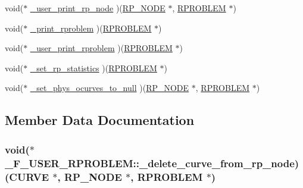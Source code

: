 \begin{DoxyCompactItemize}
\item 
void($\ast$ \hyperlink{struct___f___u_s_e_r___r_p_r_o_b_l_e_m_a0be7de983b0c1920fb6096b63138057a}{\+\_\+user\+\_\+print\+\_\+rp\+\_\+node} )(\hyperlink{frp_8h_ad37baa973dc0759df1cd3e455f890ddf}{R\+P\+\_\+\+N\+O\+DE} $\ast$, \hyperlink{frp_8h_a8e39ec4bf8bcc03a2e164b2ab39b9b33}{R\+P\+R\+O\+B\+L\+EM} $\ast$)
\item 
void($\ast$ \hyperlink{struct___f___u_s_e_r___r_p_r_o_b_l_e_m_a20f7ee4d5af733aa46d078cfc1448c17}{\+\_\+print\+\_\+rproblem} )(\hyperlink{frp_8h_a8e39ec4bf8bcc03a2e164b2ab39b9b33}{R\+P\+R\+O\+B\+L\+EM} $\ast$)
\item 
void($\ast$ \hyperlink{struct___f___u_s_e_r___r_p_r_o_b_l_e_m_a6431002f3b7a9b923ed56d17ea32b2d6}{\+\_\+user\+\_\+print\+\_\+rproblem} )(\hyperlink{frp_8h_a8e39ec4bf8bcc03a2e164b2ab39b9b33}{R\+P\+R\+O\+B\+L\+EM} $\ast$)
\item 
void($\ast$ \hyperlink{struct___f___u_s_e_r___r_p_r_o_b_l_e_m_a6b77cb1a6dd8516cf507e42160fddef1}{\+\_\+set\+\_\+rp\+\_\+statistics} )(\hyperlink{frp_8h_a8e39ec4bf8bcc03a2e164b2ab39b9b33}{R\+P\+R\+O\+B\+L\+EM} $\ast$)
\item 
void($\ast$ \hyperlink{struct___f___u_s_e_r___r_p_r_o_b_l_e_m_ab69ac77d8e978a42dd66708034f431a9}{\+\_\+set\+\_\+phys\+\_\+ocurves\+\_\+to\+\_\+null} )(\hyperlink{frp_8h_ad37baa973dc0759df1cd3e455f890ddf}{R\+P\+\_\+\+N\+O\+DE} $\ast$, \hyperlink{frp_8h_a8e39ec4bf8bcc03a2e164b2ab39b9b33}{R\+P\+R\+O\+B\+L\+EM} $\ast$)
\end{DoxyCompactItemize}


\subsection{Member Data Documentation}
\subsubsection[{\texorpdfstring{\+\_\+delete\+\_\+curve\+\_\+from\+\_\+rp\+\_\+node}{_delete_curve_from_rp_node}}]{\setlength{\rightskip}{0pt plus 5cm}void($\ast$ \+\_\+\+F\+\_\+\+U\+S\+E\+R\+\_\+\+R\+P\+R\+O\+B\+L\+E\+M\+::\+\_\+delete\+\_\+curve\+\_\+from\+\_\+rp\+\_\+node) ({\bf C\+U\+R\+VE} $\ast$, {\bf R\+P\+\_\+\+N\+O\+DE} $\ast$, {\bf R\+P\+R\+O\+B\+L\+EM} $\ast$)}\hypertarget{struct___f___u_s_e_r___r_p_r_o_b_l_e_m_af7f10000c441409d2b3c9795df3ced14}{}\label{struct___f___u_s_e_r___r_p_r_o_b_l_e_m_af7f10000c441409d2b3c9795df3ced14}
